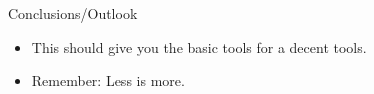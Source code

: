 \documentclass[mathserif]{beamer}
\begin{document}
\begin{Bframe}
  {Conclusions/Outlook}
  \begin{itemize}
    \item This should give you the basic tools for a decent tools. 
    \item Remember: Less is more.
  \end{itemize}
\end{Bframe}

\end{document}
